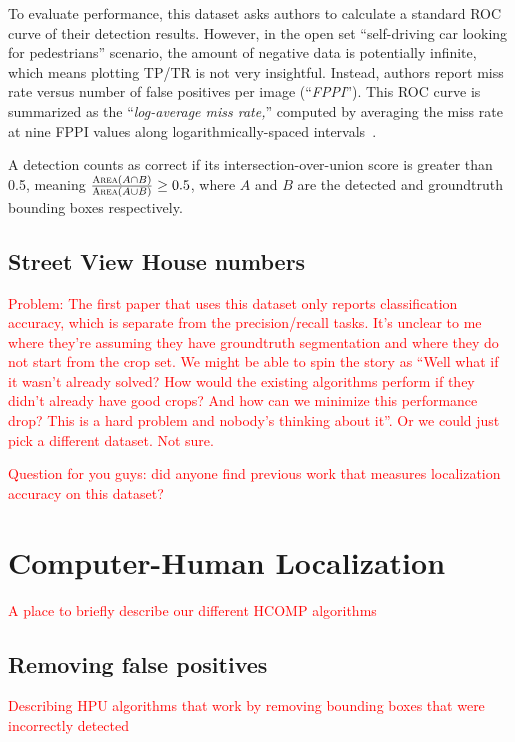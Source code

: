 \documentclass[10pt,twocolumn,letterpaper]{article}
\newcommand{\preliminary}[1]{\textcolor{red}{#1}}
\newcommand{\todo}{\colorbox{yellow}{\fbox{\LARGE{TODO}}}}
\begin{document}
To evaluate performance, this dataset asks authors to calculate a standard ROC curve of their detection results. However, in the open set ``self-driving car looking for pedestrians'' scenario, the amount of negative data is potentially infinite, which means plotting TP/TR is not very insightful. Instead, authors report miss rate versus number of false positives per image (``\emph{FPPI}''). This ROC curve is summarized as the ``\emph{log-average miss rate,}'' computed by averaging the miss rate at nine FPPI values along logarithmically-spaced intervals~\cite{Dollar2012PAMI}.

A detection counts as correct if its intersection-over-union score is greater than 0.5, meaning $\frac{\textsc{Area}(A \cap B)}{\textsc{Area}(A \cup B)} \geq 0.5$, where $A$ and $B$ are the detected and groundtruth bounding boxes respectively.

\subsection{Street View House numbers}
\cite{netzer2011reading}

\preliminary{Problem: The first paper that uses this dataset \cite{netzer2011reading} only reports classification accuracy, which is separate from the precision/recall tasks. It's unclear to me where they're assuming they have groundtruth segmentation and where they do not start from the crop set. We might be able to spin the story as ``Well what if it wasn't already solved? How would the existing algorithms perform if they didn't already have good crops? And how can we minimize this performance drop? This is a hard problem and nobody's thinking about it''. Or we could just pick a different dataset. Not sure.}

\preliminary{Question for you guys: did anyone find previous work that measures localization accuracy on this dataset?}

\section{Computer-Human Localization}
\preliminary{
A place to briefly describe our different HCOMP algorithms
}

\subsection{Removing false positives}
\todo \preliminary{ Describing HPU algorithms that work by removing bounding boxes that were incorrectly detected }
\end{document}
